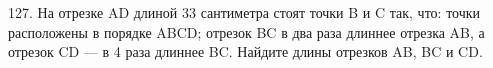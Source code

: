 127. На отрезке AD длиной 33 сантиметра стоят точки B и C так, что: точки расположены в порядке ABCD; отрезок BC в два раза длиннее отрезка AB, а отрезок CD --- в 4 раза длиннее BC. Найдите длины отрезков AB, BC и CD.\\

